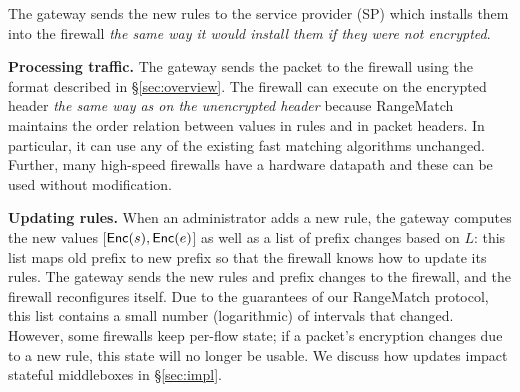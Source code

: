 The gateway sends the new rules to the service provider (SP) which installs them into the firewall {\em the same way it would install 
them if they were not encrypted}. 

\noindent\textbf{Processing traffic.}
The gateway sends the packet to the firewall using the format described in \S\ref{sec:overview}. The firewall can execute on the encrypted header {\em
the same way as on the unencrypted header} because RangeMatch maintains the order relation between values in rules and in 
packet headers. 
In particular, it can use any of the existing fast matching algorithms unchanged. 
Further, many high-speed firewalls have a hardware datapath and these can be used without modification.


\noindent\textbf{Updating rules.} 
When an administrator adds a new rule, the gateway computes the new values [$\mathsf{Enc}(s), \mathsf{Enc}(e)$] as well as a list of prefix changes based on $L$: this list maps old prefix to new prefix so that the firewall knows how to update its rules. 
The gateway sends the new rules and prefix changes to the firewall, and the firewall reconfigures itself. 
  Due to the guarantees of our RangeMatch protocol, this list contains a 
small number (logarithmic) of intervals that changed.
However, some firewalls keep per-flow state; if a packet's encryption changes due to a new rule, this state will no longer be usable.
We discuss how updates impact stateful middleboxes in \S\ref{sec:impl}.
